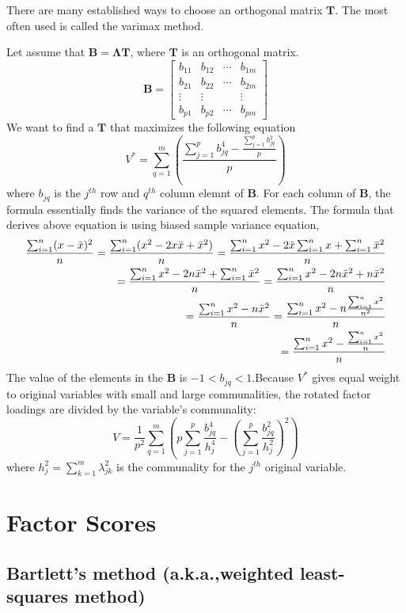 \documentclass{article}
\begin{document}
There are many established ways to choose an orthogonal matrix $\mathbf{T}$. The most often used is called the varimax method.

Let assume that $\mathbf{B}=\mathbf{\Lambda T}$, where $\mathbf{T}$ is an orthogonal matrix.
\[\mathbf{B} = \begin{bmatrix}b_{11} & b_{12} & \cdots & b_{1m}\\
                              b_{21} & b_{22} & \cdots & b_{2m}\\
                              \vdots & \vdots &        & \vdots\\
                              b_{p1} & b_{p2} & \cdots & b_{pm}
                \end{bmatrix}\]
We want to find a $\mathbf{T}$ that maximizes the following equation
\[V^*=\sum_{q=1}^m(\frac{\sum_{j=1}^p b_{jq}^4-\frac{\sum_{j=1}^pb_{jq}^2}{p}}{p})\]
where $b_{jq}$ is the $j^{th}$ row and $q^{th}$ column elemnt of $\mathbf{B}$. For each column of $\mathbf{B}$, the formula essentially finds the variance of the squared elements. The formula that derives above equation is using biased sample variance equation,
\begin{align*}
\frac{\sum_{i=1}^n(x-\Bar{x})^2}{n}
= \frac{\sum_{i=1}^n(x^2-2x\Bar{x}+\Bar{x}^2)}{n}
= \frac{\sum_{i=1}^nx^2-2\Bar{x}\sum_{i=1}^nx+\sum_{i=1}^n\Bar{x}^2}{n}\\
= \frac{\sum_{i=1}^nx^2-2n\Bar{x}^2+\sum_{i=1}^n\Bar{x}^2}{n}
= \frac{\sum_{i=1}^nx^2-2n\Bar{x}^2+n\Bar{x}^2}{n}\\
= \frac{\sum_{i=1}^nx^2-n\Bar{x}^2}{n}
= \frac{\sum_{i=1}^nx^2-n\frac{\sum_{i=1}^nx^2}{n^2}}{n}\\
= \frac{\sum_{i=1}^nx^2-\frac{\sum_{i=1}^nx^2}{n}}{n}
\end{align*}
The value of the elements in the $\mathbf{B}$ is $-1<b_{jq}<1$.Because $V^*$ gives equal weight to original variables with small and large communalities, the rotated factor loadings are divided by the variable’s communality:
\[V=\frac{1}{p^2}\sum_{q=1}^m(p\sum_{j=1}^p\frac{b_{jq}^4}{h_j^4}-(\sum_{j=1}^p
\frac{b_{jq}^2}{h_j^2})^2)\]
where $h_j^2=\sum_{k=1}^m\lambda_{jk}^2$  is the communality for the $j^{th}$ original variable.

\section{Factor Scores}

\subsection{Bartlett’s method (a.k.a.,weighted least-squares method)}
\end{document}

